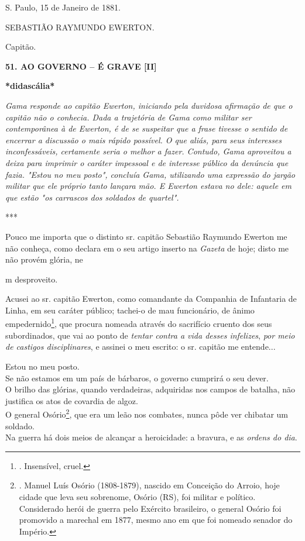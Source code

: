 S. Paulo, 15 de Janeiro de 1881.

SEBASTIÃO RAYMUNDO EWERTON.

Capitão.

\textbf{51. AO GOVERNO -- É GRAVE {[}II{]}}

\textbf{*didascália*}

\emph{Gama responde ao capitão Ewerton, iniciando pela duvidosa
afirmação de que o capitão não o conhecia. Dada a trajetória de Gama
como militar ser contemporânea à de Ewerton, é de se suspeitar que a
frase tivesse o sentido de encerrar a discussão o mais rápido possível.
O que aliás, para seus interesses inconfessáveis, certamente seria o
melhor a fazer. Contudo, Gama aproveitou a deixa para imprimir o caráter
impessoal e de interesse público da denúncia que fazia. "Estou no meu
posto", concluía Gama, utilizando uma expressão do jargão militar que
ele próprio tanto lançara mão. E Ewerton estava no dele: aquele em que
estão "os carrascos dos soldados de quartel". }

***

Pouco me importa que o distinto sr. capitão Sebastião Raymundo Ewerton
me não conheça, como declara em o seu artigo inserto na \emph{Gazeta} de
hoje; disto me não provém glória, ne

m desproveito.

Acusei ao sr. capitão Ewerton, como comandante da Companhia de
Infantaria de Linha, em seu caráter público; tachei-o de mau
funcionário, de ânimo empedernido\footnote{. Insensível, cruel.}, que
procura nomeada através do sacrifício cruento dos seus subordinados, que
vai ao ponto de \emph{tentar contra a vida desses infelizes}, \emph{por
meio de castigos disciplinares}, e assinei o meu escrito: o sr. capitão
me entende...

Estou no meu posto.\\
Se não estamos em um país de bárbaros, o governo cumprirá o seu dever.\\
O brilho das glórias, quando verdadeiras, adquiridas nos campos de
batalha, não justifica os atos de covardia de algoz.\\
O general Osório\footnote{. Manuel Luís Osório (1808-1879), nascido em
  Conceição do Arroio, hoje cidade que leva seu sobrenome, Osório (RS),
  foi militar e político. Considerado herói de guerra pelo Exército
  brasileiro, o general Osório foi promovido a marechal em 1877, mesmo
  ano em que foi nomeado senador do Império.},
que era um leão nos
combates, nunca pôde ver chibatar um soldado.\\
Na guerra há dois meios de alcançar a heroicidade: a bravura, e as
\emph{ordens do dia}.


